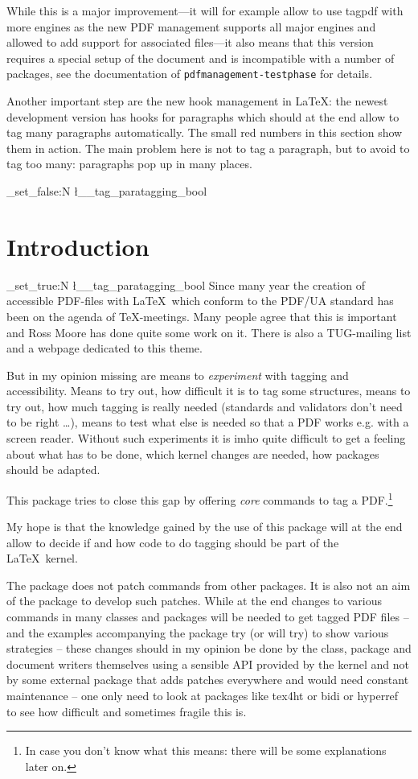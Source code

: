 \documentclass[DIV=12,parskip=half-,bibliography=totoc]{scrartcl}
\newcommand\PDF{PDF}
\newcommand\parataggingON {\bool_set_true:N \l__tag_paratagging_bool}
\newcommand\parataggingOff{\bool_set_false:N \l__tag_paratagging_bool}
\begin{document}
While this is a major improvement---it will for example allow to use tagpdf with more engines as the new PDF management supports all major engines and allowed to add support for associated files---it also means that this version requires a special setup of the document and is incompatible with a number of packages,
see the documentation of \texttt{pdfmanagement-testphase} for details.

Another important step are the new hook management in \LaTeX: the newest development version has hooks for paragraphs which should at the end allow to tag many paragraphs automatically. The small red numbers in this section show them in action. The main problem here is not to tag a paragraph, but to avoid to tag too many: paragraphs pop up in many places.


\parataggingOff

\section{Introduction}


\parataggingON
Since many year the creation of accessible \PDF{}-files with \LaTeX\ which conform to the PDF/UA standard has been on the agenda of \TeX-meetings. Many people agree that this is important and Ross Moore has done quite some work on it. There is also a TUG-mailing list and a webpage \parencite{tugaccess} dedicated to this theme.

But in my opinion missing are means to \emph{experiment} with tagging and accessibility. Means to try out, how difficult it is to tag some structures, means to try out, how much tagging is really needed (standards and validators don't need to be right \ldots), means to test what else is needed so that a \PDF{} works e.g. with a screen reader. Without such experiments it is imho quite difficult to get a feeling about what has to be done, which kernel changes are needed, how packages should be adapted.

This package tries to close this gap by offering \emph{core} commands to tag a \PDF{}.\footnote{In case you don't know what this means: there will be some explanations later on.}

My hope is that the knowledge gained by the use of this package will at the end allow to decide if and how code to do tagging should be part of the \LaTeX\ kernel.

The package does not patch commands from other packages. It is also not an aim of the package to develop such patches. While at the end changes to various commands in many classes and packages will be needed to get tagged \PDF{} files -- and the examples accompanying the package try (or will try) to show various strategies -- these changes should in my opinion be done by the class, package and document writers themselves using a sensible API provided by the kernel and not by some external package that adds patches everywhere and would need constant maintenance -- one only need to look at packages like tex4ht or bidi or hyperref to see how difficult and sometimes fragile this is.
\end{document}
